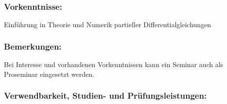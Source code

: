 \documentclass[a4paper,10pt]{article}
\begin{document}
\subsubsection*{\large
    Vorkenntnisse:
}
Einführung in Theorie und Numerik partieller Differentialgleichungen
\subsubsection*{\large
    Bemerkungen:
}
Bei Interesse und vorhandenen Vorkenntnissen kann ein Seminar auch als Proseminar eingesetzt werden.
\cleardoublepage
\subsubsection*{\large
    Verwendbarkeit, Studien- und Prüfungsleistungen:
}
\end{document}
